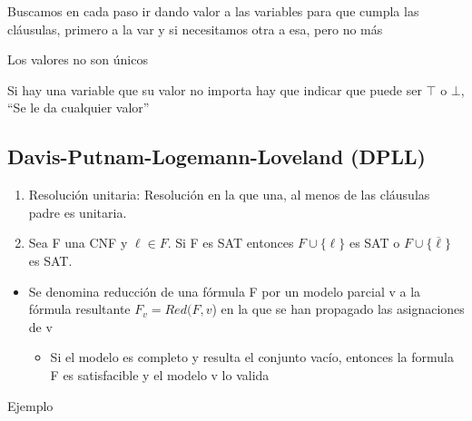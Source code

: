 \documentclass[12pt, twoside, openright]{report} %
\begin{document}
Buscamos en cada paso ir dando valor a las variables para que cumpla las cláusulas, primero a la var y si necesitamos otra a esa, pero no más

Los valores no son únicos

Si hay una variable que su valor no importa hay que indicar que puede ser $\top$ o $\bot$, \enquote{Se le da cualquier valor}


\subsection{Davis-Putnam-Logemann-Loveland (DPLL)}

\begin{enumerate}
	\def\labelenumi{\arabic{enumi}.}
	\item Resolución unitaria: Resolución en la que una, al menos de las
	      cláusulas padre es unitaria.
	\item Sea F una CNF y \(\ell \in F\). Si F es SAT entonces
	      \(F \cup \{ \ell \}\) es SAT o \(F \cup \{ \overline{\ell} \}\) es
	      SAT.
\end{enumerate}

\begin{itemize}
	\item Se denomina reducción de una fórmula F por un modelo parcial v a la
	      fórmula resultante \(F_v = Red(F, v\)) en la que se han propagado
	      las asignaciones de v

	      \begin{itemize}
		      \item Si el modelo es completo y resulta el conjunto vacío, entonces la
		            formula F es satisfacible y el modelo v lo valida
	      \end{itemize}
\end{itemize}

Ejemplo
\end{document}
